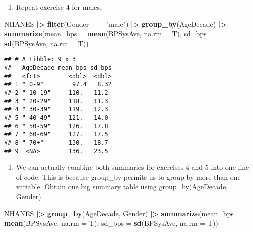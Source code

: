 \documentclass[
]{article}
\newenvironment{Shaded}{\begin{snugshade}}{\end{snugshade}}
\newcommand{\AttributeTok}[1]{\textcolor[rgb]{0.13,0.29,0.53}{#1}}
\newcommand{\FunctionTok}[1]{\textcolor[rgb]{0.13,0.29,0.53}{\textbf{#1}}}
\newcommand{\NormalTok}[1]{#1}
\newcommand{\SpecialCharTok}[1]{\textcolor[rgb]{0.81,0.36,0.00}{\textbf{#1}}}
\newcommand{\StringTok}[1]{\textcolor[rgb]{0.31,0.60,0.02}{#1}}
\providecommand{\tightlist}{%
  \setlength{\itemsep}{0pt}\setlength{\parskip}{0pt}}
\begin{document}
\begin{enumerate}
\def\labelenumi{\arabic{enumi}.}
\setcounter{enumi}{4}
\tightlist
\item
  Repeat exercise 4 for males.
\end{enumerate}

\begin{Shaded}
\begin{Highlighting}[]
\NormalTok{NHANES }\SpecialCharTok{|\textgreater{}} 
  \FunctionTok{filter}\NormalTok{(Gender }\SpecialCharTok{==} \StringTok{"male"}\NormalTok{) }\SpecialCharTok{|\textgreater{}} 
  \FunctionTok{group\_by}\NormalTok{(AgeDecade) }\SpecialCharTok{|\textgreater{}} 
  \FunctionTok{summarize}\NormalTok{(}\AttributeTok{mean\_bps =} \FunctionTok{mean}\NormalTok{(BPSysAve, }\AttributeTok{na.rm =}\NormalTok{ T),}
            \AttributeTok{sd\_bps =} \FunctionTok{sd}\NormalTok{(BPSysAve, }\AttributeTok{na.rm =}\NormalTok{ T))}
\end{Highlighting}
\end{Shaded}

\begin{verbatim}
## # A tibble: 9 x 3
##   AgeDecade mean_bps sd_bps
##   <fct>        <dbl>  <dbl>
## 1 " 0-9"        97.4   8.32
## 2 " 10-19"     110.   11.2 
## 3 " 20-29"     118.   11.3 
## 4 " 30-39"     119.   12.3 
## 5 " 40-49"     121.   14.0 
## 6 " 50-59"     126.   17.8 
## 7 " 60-69"     127.   17.5 
## 8 " 70+"       130.   18.7 
## 9  <NA>        136.   23.5
\end{verbatim}

\begin{enumerate}
\def\labelenumi{\arabic{enumi}.}
\setcounter{enumi}{5}
\tightlist
\item
  We can actually combine both summaries for exercises 4 and 5 into one
  line of code. This is because group\_by permits us to group by more
  than one variable. Obtain one big summary table using
  group\_by(AgeDecade, Gender).
\end{enumerate}

\begin{Shaded}
\begin{Highlighting}[]
\NormalTok{NHANES }\SpecialCharTok{|\textgreater{}} 
  \FunctionTok{group\_by}\NormalTok{(AgeDecade, Gender) }\SpecialCharTok{|\textgreater{}} 
  \FunctionTok{summarize}\NormalTok{(}\AttributeTok{mean\_bps =} \FunctionTok{mean}\NormalTok{(BPSysAve, }\AttributeTok{na.rm =}\NormalTok{ T),}
            \AttributeTok{sd\_bps =} \FunctionTok{sd}\NormalTok{(BPSysAve, }\AttributeTok{na.rm =}\NormalTok{ T))}
\end{Highlighting}
\end{Shaded}
\end{document}
